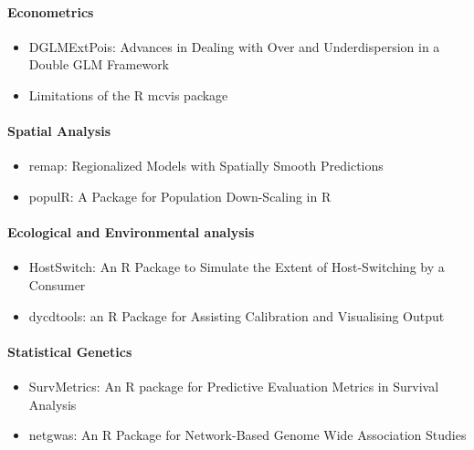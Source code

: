 \hypertarget{econometrics}{%
\paragraph{Econometrics}\label{econometrics}}

\begin{itemize}
\tightlist
\item
  DGLMExtPois: Advances in Dealing with Over and Underdispersion in a Double GLM Framework
\item
  Limitations of the R mcvis package
\end{itemize}

\hypertarget{spatial-analysis}{%
\paragraph{Spatial Analysis}\label{spatial-analysis}}

\begin{itemize}
\tightlist
\item
  remap: Regionalized Models with Spatially Smooth Predictions
\item
  populR: A Package for Population Down-Scaling in R
\end{itemize}

\hypertarget{ecological-and-environmental-analysis}{%
\paragraph{Ecological and Environmental analysis}\label{ecological-and-environmental-analysis}}

\begin{itemize}
\tightlist
\item
  HostSwitch: An R Package to Simulate the Extent of Host-Switching by a Consumer
\item
  dycdtools: an R Package for Assisting Calibration and Visualising Output
\end{itemize}

\hypertarget{statistical-genetics}{%
\paragraph{Statistical Genetics}\label{statistical-genetics}}

\begin{itemize}
\tightlist
\item
  SurvMetrics: An R package for Predictive Evaluation Metrics in Survival Analysis
\item
  netgwas: An R Package for Network-Based Genome Wide Association Studies
\end{itemize}

